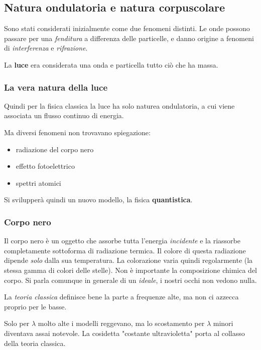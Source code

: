 \subsection{Natura ondulatoria e natura corpuscolare}
Sono stati considerati inizialmente come due fenomeni distinti. Le onde possono passare per una \emph{fenditura} a differenza delle particelle, e danno origine a fenomeni di \emph{interferenza} e \emph{rifrazione}. 

La \textbf{luce} era considerata una onda e particella tutto ciò che ha massa.


\subsubsection{La vera natura della luce}
Quindi per la fisica classica la luce ha solo naturea ondulatoria, a cui viene associata un flusso continuo di energia.


Ma diversi fenomeni non trovavano spiegazione: 
\begin{itemize}
    \item radiazione del corpo nero
    \item effetto fotoelettrico
    \item spettri atomici
\end{itemize}
Si svilupperà quindi un nuovo modello, la fisica \textbf{quantistica}.

\subsubsection{Corpo nero}
Il corpo nero è un oggetto che assorbe tutta l'energia \emph{incidente} e la riassorbe completamente sottoforma di radiazione termica. Il colore di questa radiazione dipende \emph{solo} dalla sua temperatura. La colorazione varia quindi regolarmente (la stessa gamma di colori delle stelle). 
Non è importante la composizione chimica del corpo. 
Si parla comunque in generale di un \emph{ideale}, i nostri occhi non vedono nulla. 


La \emph{teoria classica} definisce bene la parte a frequenze alte, ma non ci azzecca proprio per le basse. 


Solo per $\lambda$ molto alte i modelli reggevano, ma lo scostamento per $\lambda$ minori diventava assai notevole. La cosidetta "costante ultravioletta" porta al collasso della teoria classica. 

